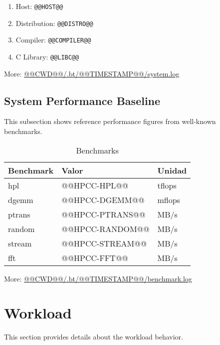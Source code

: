 \documentclass[a4paper]{article}
\begin{document}
\begin{enumerate}
\item Host: {\tt @@HOST@@}
\item Distribution: {\tt @@DISTRO@@}
\item Compiler: {\tt @@COMPILER@@}
\item C Library: {\tt @@LIBC@@}
\end{enumerate}

More: \href{@@CWD@@/.bt/@@TIMESTAMP@@/system.log}{@@CWD@@/.bt/@@TIMESTAMP@@/system.log}

\subsection{System Performance Baseline}

This subsection shows reference performance figures from well-known benchmarks.

\begin{table}[H]
\caption{Benchmarks}
  \centering
    \begin{tabular}{|l|l|l|}\hline
      {\bf Benchmark} & {\bf Valor} & {\bf Unidad} \\ \hline
      hpl & @@HPCC-HPL@@ & tflops \\ \hline
      dgemm & @@HPCC-DGEMM@@ & mflops \\ \hline
      ptrans & @@HPCC-PTRANS@@ & MB/s \\ \hline
      random & @@HPCC-RANDOM@@ & MB/s \\ \hline
      stream & @@HPCC-STREAM@@ & MB/s \\ \hline
      fft & @@HPCC-FFT@@ & MB/s \\ \hline
    \end{tabular}
 \label{table:pruebas}
\end{table}

More: \href{@@CWD@@/.bt/@@TIMESTAMP@@/benchmark.log}{@@CWD@@/.bt/@@TIMESTAMP@@/benchmark.log}

\section{Workload}

This section provides details about the workload behavior.
\end{document}
